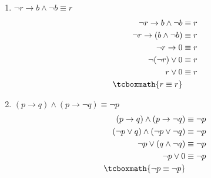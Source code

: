 \documentclass[10pt,letterpaper]{article}
\begin{document}
\begin{enumerate}
        \begin{enumerate}
            \item $\neg r \rightarrow b \land \neg b \equiv r$
                \begin{equation*} \begin{split} \begin{aligned}
                    \neg r \rightarrow b \land \neg b &\equiv r \\
                    \neg r \rightarrow (b \land \neg b) &\equiv r \\
                    \neg r \rightarrow 0 &\equiv r \\
                    \neg (\neg r) \lor 0 &\equiv r \\
                    r \lor 0 &\equiv r \\
                    \tcboxmath{r \equiv r} \\
                \end{aligned} \end{split} \end{equation*}

            \item $(p \rightarrow q) \land (p \rightarrow \neg q) \equiv \neg p$
                \begin{equation*} \begin{split} \begin{aligned}
                    (p \rightarrow q) \land (p \rightarrow \neg q) &\equiv \neg p \\
                    (\neg p \lor q) \land (\neg p \lor \neg q) &\equiv \neg p \\
                    \neg p \lor (q \land \neg q) &\equiv \neg p \\
                    \neg p \lor 0 &\equiv \neg p \\
                    \tcboxmath{\neg p \equiv \neg p} \\
                \end{aligned} \end{split} \end{equation*}


\end{enumerate}
\end{enumerate}
\end{document}
